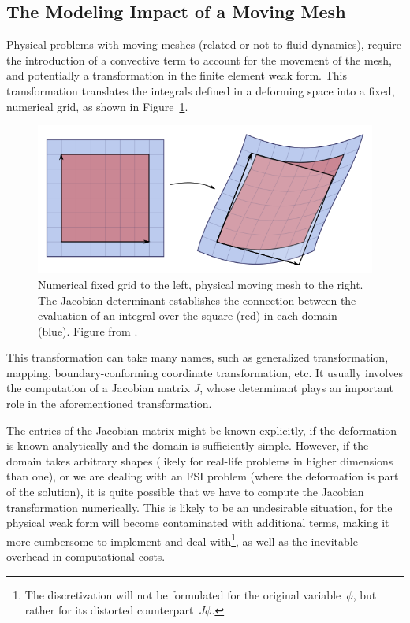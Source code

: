 \documentclass[thesis.tex]{subfiles}
\begin{document}
\subsection{The Modeling Impact of a Moving Mesh}
Physical problems with moving meshes 
(related or not to fluid dynamics),
require the introduction of a convective term to account for 
the movement of the mesh, 
and potentially a transformation in the finite element weak form.
This transformation translates the integrals 
defined in a deforming space into a fixed, 
numerical grid, 
as shown in Figure~\ref{fig:jacobianTransformation}.
\begin{figure}[h]
    \includegraphics[width=\columnwidth]{research_project/piston/figures/Jacobian_determinant_and_distortion.png}
    \caption{Numerical fixed grid to the left, physical moving mesh to the right.
    The Jacobian determinant establishes the connection between 
    the evaluation of an integral over the square (red) in each domain (blue).
    Figure from \cite{jacobianTransformation}.}
    \label{fig:jacobianTransformation}
\end{figure}

This transformation can take many names, 
such as generalized transformation, 
mapping,
boundary-conforming coordinate transformation,
etc.
It usually involves the computation of a Jacobian matrix $J$,
whose determinant plays an important role in the aforementioned transformation.

The entries of the Jacobian matrix might be known explicitly,
if the deformation is known analytically and the domain is sufficiently simple.
However, if the domain takes arbitrary shapes 
(likely for real-life problems in higher dimensions than one),
or we are dealing with an FSI problem (where the deformation is part of the solution),
it is quite possible that we have to compute the Jacobian transformation numerically.
This is likely to be an undesirable situation, 
for the physical weak form will become contaminated with additional terms, 
making it more cumbersome to implement and deal with\footnote{
    The discretization will not be formulated for the original variable~$\phi$,
    but rather for its distorted counterpart~$J \phi$.
    },
as well as the inevitable overhead in computational costs.
\end{document}
